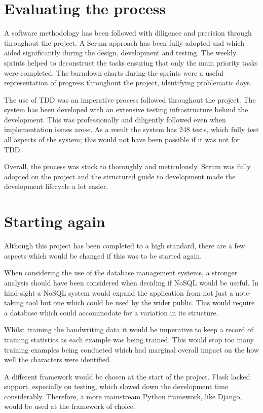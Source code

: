 \section{Evaluating the process}
A software methodology has been followed with diligence and precision through throughout the project. A Scrum approach has been fully adopted and which aided significantly during the design, development and testing. The weekly sprints helped to deconstruct the tasks ensuring that only the main priority tasks were completed. The burndown charts during the sprints were a useful representation of progress throughout the project, identifying problematic days.

The use of TDD was an imperative process followed throughout the project. The system has been developed with an extensive testing infrastructure behind the development. This was professionally and diligently followed even when implementation issues arose. As a result the system has 248 tests, which fully test all aspects of the system; this would not have been possible if it was not for TDD.

Overall, the process was stuck to thoroughly and meticulously. Scrum was fully adopted on the project and the structured guide to development made the development lifecycle a lot easier.

\section{Starting again}
Although this project has been completed to a high standard, there are a few aspects which would be changed if this was to be started again.

When considering the use of the database management systems, a stronger analysis should have been considered when deciding if NoSQL would be useful. In hind-sight a NoSQL system would expand the application from not just a note-taking tool but one which could be used by the wider public. This would require a database which could accommodate for a variation in its structure.

Whilst training the handwriting data it would be imperative to keep a record of  training statistics as each example was being trained. This would stop too many training examples being conducted which had marginal overall impact on the how well the characters were identified.

A different framework would be chosen at the start of the project. Flask lacked support, especially on testing, which slowed down the development time considerably. Therefore, a more mainstream Python framework, like Django, would be used at the framework of choice.


